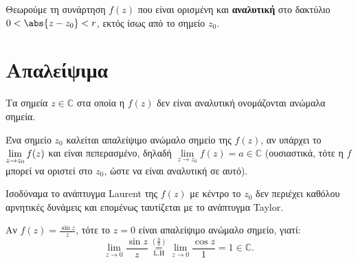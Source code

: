 




\everymath{\displaystyle}
\thispagestyle{empty}







\begin{center}
  \minibox{\large\bfseries \textcolor{Col1}{Ανώμαλα Σημεία}}
\end{center}

\vspace{\baselineskip} 

Θεωρούμε τη συνάρτηση $f(z)$ που είναι ορισμένη και \textbf{αναλυτική} στο δακτύλιο 
$0<\abs{z-z_0}<r$, εκτός ίσως από το σημείο $z_0$. 


\section*{Απαλείψιμα}

\begin{dfn}
  Τα σημεία $z\in \mathbb{C}$ στα οποία η $f(z)$ δεν είναι αναλυτική ονομάζονται 
  \textcolor{Col1}{ανώμαλα} σημεία.
\end{dfn}

\begin{dfn} 
  Ένα σημείο $z_0$ καλείται \textcolor{Col1}{απαλείψιμο} ανώμαλο σημείο της $f(z)$, 
  αν υπάρχει το $\lim\limits_{\smash{z\to z_0}}f(z)$ και είναι πεπερασμένο, 
  δηλαδή $\lim\limits_{z\to z_0}f(z)=a\in \mathbb{C}$ (ουσιαστικά, τότε η $f$
  μπορεί να οριστεί στο $z_{0}$, ώστε να είναι αναλυτική σε αυτό).

  \begin{myitemize}
    \item Ισοδύναμα το ανάπτυγμα \textlatin{Laurent} της $f(z)$ \textcolor{Col2}{με κέντρο το $z_0$} 
      δεν περιέχει καθόλου αρνητικές δυνάμεις και επομένως ταυτίζεται με το ανάπτυγμα 
      \textlatin{Taylor.}
  \end{myitemize} 
\end{dfn}

\begin{example}
  Αν $f(z)=\frac{\sin z}{z}$, τότε το $z=0$ είναι απαλείψιμο ανώμαλο σημείο, γιατί:
  \[
    \lim\limits_{z\to 0}\frac{\sin z}{z} 
    \overset{(\frac{0}{0})}{\underset{\text{L.H}}{=}} 
    \lim\limits_ {z\to 0}\frac{\cos z}{1}=1\in \mathbb{C}.
  \]
\end{example}

